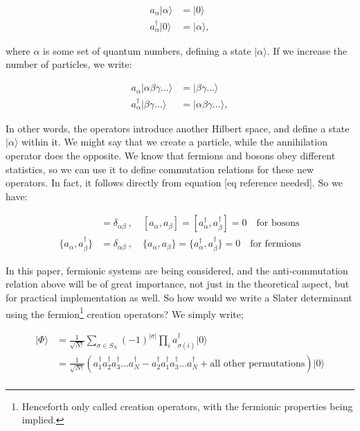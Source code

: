 \documentclass[10pt]{report}
\begin{document}
	\begin{align}
		a_\alpha|\alpha\rangle &= |0\rangle\\
		a_\alpha^\dagger|0\rangle &= |\alpha\rangle,
	\end{align}
	
	where $\alpha$ is some set of quantum numbers, defining a state $|\alpha\rangle$. If we increase the number of particles, we write:
	
	\begin{align}
		a_\alpha|\alpha\beta\gamma\ldots\rangle &= |\beta\gamma\ldots\rangle\\
		a_\alpha^\dagger|\beta\gamma\ldots\rangle &= |\alpha\beta\gamma\ldots\rangle,
	\end{align}
	
	In other words, the operators introduce another Hilbert space, and define a state $|\alpha\rangle$ within it. We might say that we create a particle, while the annihilation operator does the opposite. We know that fermions and bosons obey different statistics, so we can use it to define commutation relations for these new operators. In fact, it follows directly from equation [eq reference needed]. So we have:
	
	\begin{align}
		[a_\alpha,a_\beta^\dagger] &= \delta_{\alpha\beta} \:,\quad [a_\alpha,a_\beta] = [a_\alpha^\dagger,a_\beta^\dagger] = 0 \quad \text{for bosons}\\
		\{a_\alpha,a_\beta^\dagger\} &= \delta_{\alpha\beta} \:,\quad \{a_\alpha,a_\beta\} = \{a_\alpha^\dagger,a_\beta^\dagger\} = 0 \quad \text{for fermions}
	\end{align}
	
	In this paper, fermionic systems are being considered, and the anti-commutation relation above will be of great importance, not just in the theoretical aspect, but for practical implementation as well.
	So how would we write a Slater determinant using the fermion\footnote{Henceforth only called creation operators, with the fermionic properties being implied.} creation operators? We simply write;
	
	\begin{align}
		|\Phi\rangle &= \frac{1}{\sqrt{N!}}\sum_{\sigma \in S_N}(-1)^{|\sigma|}\prod_i a_{\sigma(i)}^\dagger|0\rangle\\
		&= \frac{1}{\sqrt{N!}}\left(a_1^\dagger a_2^\dagger a_3^\dagger\ldots a_N^\dagger - a_2^\dagger a_1^\dagger a_3^\dagger\ldots a_N^\dagger + \text{all other permutations}\right)|0\rangle\\
	\end{align}
	
\end{document}
